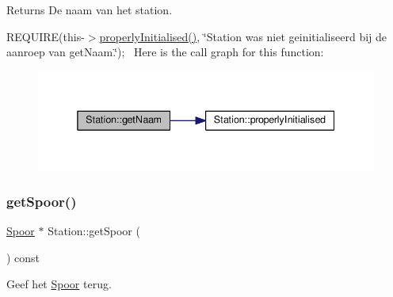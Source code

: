 \begin{DoxyReturn}{Returns}
De naam van het station.
\end{DoxyReturn}
R\+E\+Q\+U\+I\+RE(this-\/$>$\hyperlink{class_station_a9ce626dd0599e3ea8107404a59c21e16}{properly\+Initialised()}, \char`\"{}\+Station was niet geinitialiseerd bij de aanroep van get\+Naam.\char`\"{});~\newline
Here is the call graph for this function\+:\nopagebreak
\begin{figure}[H]
\begin{center}
\leavevmode
\includegraphics[width=338pt]{class_station_aea6c31c39a5e1eb4c30337e7ce489e69_cgraph}
\end{center}
\end{figure}
\mbox{\label{class_station_a5230690094cdfd1e9f443d76f35c8a19}} 
\subsubsection{\texorpdfstring{get\+Spoor()}{getSpoor()}}
{\footnotesize\ttfamily \hyperlink{class_spoor}{Spoor} $\ast$ Station\+::get\+Spoor (\begin{DoxyParamCaption}{ }\end{DoxyParamCaption}) const}



Geef het \hyperlink{class_spoor}{Spoor} terug. 

